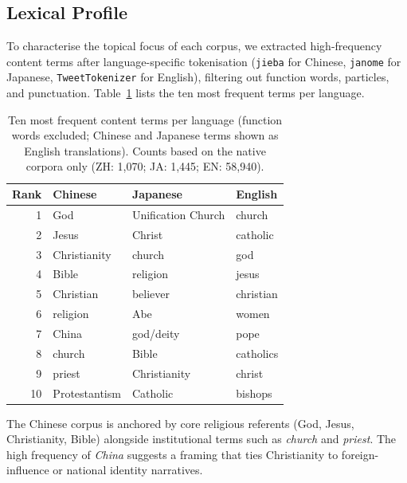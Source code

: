 \documentclass[../CLthesis.tex]{subfiles}
\begin{document}
\subsection{Lexical Profile}

To characterise the topical focus of each corpus, we extracted high-frequency content terms after language-specific tokenisation (\texttt{jieba} for Chinese\citep{jieba}, \texttt{janome} for Japanese\citep{janome}, \texttt{TweetTokenizer}\citep{loper2002nltknaturallanguagetoolkit} for English), filtering out function words, particles, and punctuation. Table~\ref{tab:top-keywords} lists the ten most frequent terms per language.

\begin{table}[htbp]
\centering
\small
\begin{tabular}{@{}rlll@{}}
\toprule
Rank & Chinese & Japanese & English \\
\midrule
1  & God            & Unification Church & church    \\
2  & Jesus          & Christ             & catholic  \\
3  & Christianity   & church             & god       \\
4  & Bible          & religion           & jesus     \\
5  & Christian      & believer           & christian \\
6  & religion       & Abe                & women     \\
7  & China          & god/deity          & pope      \\
8  & church         & Bible              & catholics \\
9  & priest         & Christianity       & christ    \\
10 & Protestantism  & Catholic           & bishops   \\
\bottomrule
\end{tabular}
\caption{Ten most frequent content terms per language (function words excluded; Chinese and Japanese terms shown as English translations). Counts based on the native corpora only (ZH: 1,070; JA: 1,445; EN: 58,940).}
\label{tab:top-keywords}
\end{table}

The Chinese corpus is anchored by core religious referents (God, Jesus, Christianity, Bible) alongside institutional terms such as \textit{church} and \textit{priest}. The high frequency of \textit{China} suggests a framing that ties Christianity to foreign-influence or national identity narratives.
\end{document}
